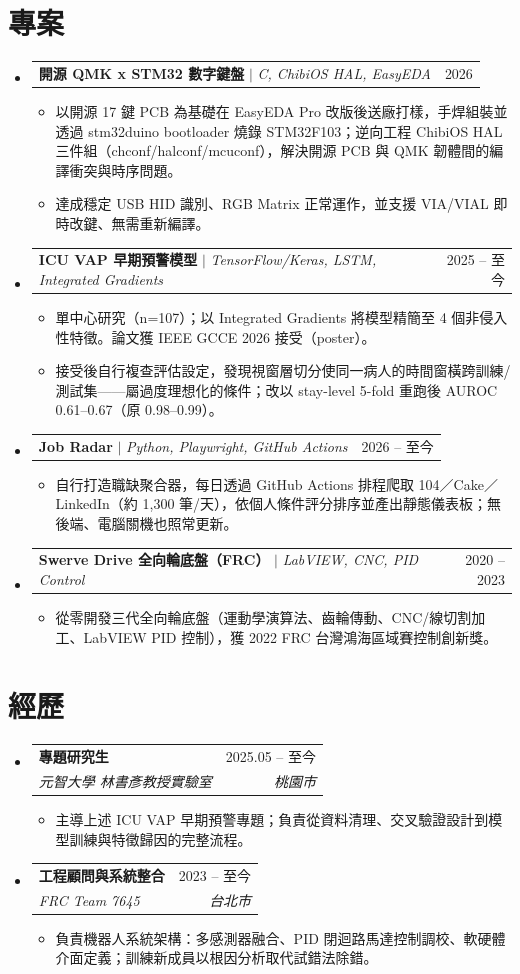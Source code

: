 \documentclass[letterpaper,11pt]{article}
\makeatletter
\newcommand{\resumeItem}[1]{
  \item\small{
    {#1 \vspace{-2pt}}
  }
}
\newcommand{\resumeSubheading}[4]{
  \vspace{-2pt}\item
    \begin{tabular*}{0.97\textwidth}[t]{l@{\extracolsep{\fill}}r}
      \textbf{#1} & #2 \\
      \textit{\small#3} & \textit{\small #4} \\
    \end{tabular*}\vspace{-3pt}
}
\newcommand{\resumeProjectHeading}[2]{
    \item
    \begin{tabular*}{0.97\textwidth}{l@{\extracolsep{\fill}}r}
      \small#1 & #2 \\
    \end{tabular*}\vspace{-3pt}
}
\newcommand{\resumeSubHeadingListStart}{\begin{itemize}[leftmargin=0.0in, label={}]}
\newcommand{\resumeSubHeadingListEnd}{\end{itemize}}
\newcommand{\resumeItemListStart}{\begin{itemize}[leftmargin=*, itemsep=2pt, topsep=4pt]}
\newcommand{\resumeItemListEnd}{\end{itemize}\vspace{-2pt}}
\makeatother
\begin{document}
\section{專案}
    \resumeSubHeadingListStart
      \resumeProjectHeading
          {\textbf{開源 QMK x STM32 數字鍵盤} $|$ \emph{C, ChibiOS HAL, EasyEDA}}{2026}
          \resumeItemListStart
            \resumeItem{以開源 17 鍵 PCB 為基礎在 EasyEDA Pro 改版後送廠打樣，手焊組裝並透過 stm32duino bootloader 燒錄 STM32F103；逆向工程 ChibiOS HAL 三件組（chconf/halconf/mcuconf），解決開源 PCB 與 QMK 韌體間的編譯衝突與時序問題。}
            \resumeItem{達成穩定 USB HID 識別、RGB Matrix 正常運作，並支援 VIA/VIAL 即時改鍵、無需重新編譯。}
          \resumeItemListEnd
      \resumeProjectHeading
          {\textbf{ICU VAP 早期預警模型} $|$ \emph{TensorFlow/Keras, LSTM, Integrated Gradients}}{2025 -- 至今}
          \resumeItemListStart
            \resumeItem{單中心研究（n=107）；以 Integrated Gradients 將模型精簡至 4 個非侵入性特徵。論文獲 IEEE GCCE 2026 接受（poster）。}
            \resumeItem{接受後自行複查評估設定，發現視窗層切分使同一病人的時間窗橫跨訓練/測試集——屬過度理想化的條件；改以 stay-level 5-fold 重跑後 AUROC 0.61--0.67（原 0.98--0.99）。}
          \resumeItemListEnd
      \resumeProjectHeading
          {\textbf{Job Radar} $|$ \emph{Python, Playwright, GitHub Actions}}{2026 -- 至今}
          \resumeItemListStart
            \resumeItem{自行打造職缺聚合器，每日透過 GitHub Actions 排程爬取 104／Cake／LinkedIn（約 1,300 筆/天），依個人條件評分排序並產出靜態儀表板；無後端、電腦關機也照常更新。}
          \resumeItemListEnd
      \resumeProjectHeading
          {\textbf{Swerve Drive 全向輪底盤（FRC）} $|$ \emph{LabVIEW, CNC, PID Control}}{2020 -- 2023}
          \resumeItemListStart
            \resumeItem{從零開發三代全向輪底盤（運動學演算法、齒輪傳動、CNC/線切割加工、LabVIEW PID 控制），獲 2022 FRC 台灣鴻海區域賽控制創新獎。}
          \resumeItemListEnd
    \resumeSubHeadingListEnd

\section{經歷}
  \resumeSubHeadingListStart
    \resumeSubheading
      {專題研究生}{2025.05 -- 至今}
      {元智大學 林書彥教授實驗室}{桃園市}
      \resumeItemListStart
        \resumeItem{主導上述 ICU VAP 早期預警專題；負責從資料清理、交叉驗證設計到模型訓練與特徵歸因的完整流程。}
      \resumeItemListEnd
    \vspace{4pt}
    \resumeSubheading
      {工程顧問與系統整合}{2023 -- 至今}
      {FRC Team 7645}{台北市}
      \resumeItemListStart
        \resumeItem{負責機器人系統架構：多感測器融合、PID 閉迴路馬達控制調校、軟硬體介面定義；訓練新成員以根因分析取代試錯法除錯。}
      \resumeItemListEnd
  \resumeSubHeadingListEnd
\end{document}
